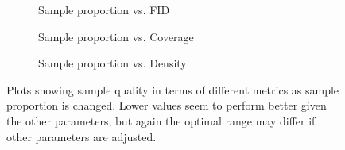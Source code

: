 \begin{figure}
    \begin{subfigure}[b]{0.33\textwidth}
        \centering
        \resizebox{\textwidth}{!}{
            
        }
        \caption{Sample proportion vs. FID}
    \end{subfigure}
    \hfill
    \begin{subfigure}[b]{0.33\textwidth}
        \centering
        \resizebox{\textwidth}{!}{
            
        }
        \caption{Sample proportion vs. Coverage}
    \end{subfigure}
    \hfill
    \begin{subfigure}[b]{0.33\textwidth}
        \centering
        \resizebox{\textwidth}{!}{
            
        }
        \caption{Sample proportion vs. Density}
    \end{subfigure}
    \caption{
        Plots showing sample quality in terms of different metrics as sample
        proportion is changed. Lower values seem to perform better given the
        other parameters, but again the optimal range may differ if other
        parameters are adjusted.
    }
    \label{fig:prop}
\end{figure}

